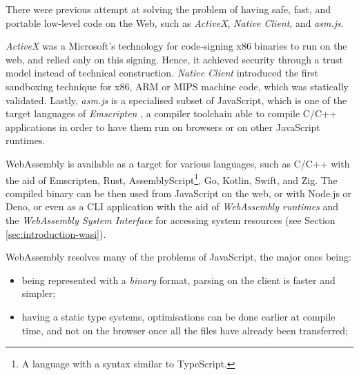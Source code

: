 There were previous attempt at solving the problem of having safe, fast, and portable low-level code on the Web,
such as \textit{ActiveX}, \textit{Native Client}, and \textit{asm.js}.

\textit{ActiveX} \cite{activex} was a Microsoft's technology for code-signing x86 binaries to run on the web, and relied only
on this signing. Hence, it achieved security through a trust model instead of technical construction.
\textit{Native Client} \cite{native-client} introduced the first sandboxing technique for x86, ARM or MIPS machine code,
which was statically validated. Lastly, \textit{asm.js} \cite{asmjs} is a specialised subset of JavaScript, which is one of the target
languages of \textit{Emscripten} \cite{emscripten}, a compiler toolchain able to compile C/C++ applications in order to have them
run on browsers or on other JavaScript runtimes.

WebAssembly is available as a target for various languages, such as C/C++ with the aid of Emscripten, Rust,
AssemblyScript\footnote{A language with a syntax similar to TypeScript.}, Go, Kotlin, Swift, and Zig.
The compiled binary can be then used from JavaScript on the web, or with Node.js or Deno, or even as a CLI application
with the aid of \textit{WebAssembly runtimes} and the \textit{WebAssembly System Interface}
for accessing system resources (see Section \ref*{sec:introduction-wasi}).

WebAssembly resolves many of the problems of JavaScript, the major ones being:
\begin{itemize}
  \item being represented with a \textit{binary} format, parsing on the client is faster and simpler;
  \item having a static type systems, optimisations can be done earlier at compile time, and not on the browser once all the files
        have already been transferred;
\end{itemize}

\vspace*{0.5cm}

